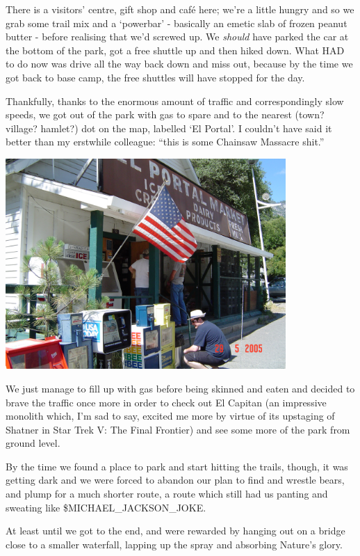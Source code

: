 \documentclass[a5paper,titlepage,11pt]{book}
\begin{document}
There is a visitors' centre, gift shop and caf\'{e} here; we're a little hungry and so we grab some trail mix and a `powerbar' - basically an emetic slab of frozen peanut butter - before realising that we'd screwed up.  We \emph{should} have parked the car at the bottom of the park, got a free shuttle up and then hiked down.  What HAD to do now was drive all the way back down and miss out, because by the time we got back to base camp, the free shuttles will have stopped for the day.

Thankfully, thanks to the enormous amount of traffic and correspondingly slow speeds, we got out of the park with gas to spare and to the nearest (town? village? hamlet?) dot on the map, labelled `El Portal'.  I couldn't have said it better than my erstwhile colleague: ``this is some Chainsaw Massacre shit.''

\begin{center}\includegraphics[width=0.8\textwidth]{gfx/DSC00663}\end{center}

We just manage to fill up with gas before being skinned and eaten and decided to brave the traffic once more in order to check out El Capitan (an impressive monolith which, I'm sad to say, excited me more by virtue of its upstaging of Shatner in Star Trek V: The Final Frontier) and see some more of the park from ground level.

By the time we found a place to park and start hitting the trails, though, it was getting dark and we were forced to abandon our plan to find and wrestle bears, and plump for a much shorter route, a route which still had us panting and sweating like \$MICHAEL\_JACKSON\_JOKE.

At least until we got to the end, and were rewarded by hanging out on a bridge close to a smaller waterfall, lapping up the spray and absorbing Nature's glory.
\end{document}
